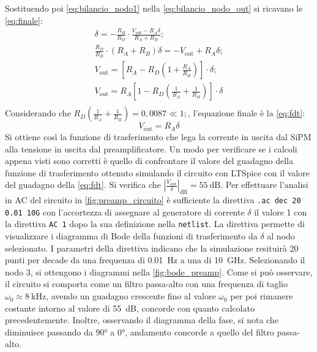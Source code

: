 Sostituendo poi \autoref*{eq:bilancio_nodo1} nella \autoref*{eq:bilancio_nodo_out} si ricavano le \autoref*{eq:finale}:
\begin{equation}
    \begin{gathered}
        \delta = -\frac{R_B}{R_D} \cdot \frac{V_\text{out} - R_A \delta}{R_A + R_B}; \\
        \frac{R_D}{R_B} \cdot (R_A + R_B) \delta = -V_\text{out}+R_A \delta; \\
        V_\text{out}=[R_A-R_D(1+\frac{R_A}{R_B})] \cdot \delta; \\
        V_\text{out}=R_A [1-R_D(\frac{1}{R_A}+\frac{1}{R_B})] \cdot \delta \\
    \end{gathered}
\label{eq:finale}
\end{equation}
Considerando che $R_D(\frac{1}{R_A}+\frac{1}{R_B})=0,0087 \ll 1;$, l'equazione finale è la \autoref*{eq:fdt}:
\begin{equation}
    V_\text{out}=R_A \delta
\label{eq:fdt}
\end{equation}
Si ottiene così la funzione di trasferimento che lega la corrente in uscita dal SiPM alla tensione in uscita dal preamplificatore. Un modo per 
verificare se i calcoli appena visti sono corretti è quello di confrontare il valore del guadagno della funzione di trasferimento ottenuto 
simulando il circuito con LTSpice con il valore del guadagno della \autoref*{eq:fdt}. Si verifica che 
$\left| \frac{V_{\text{out}}}{\delta} \right|_{\text{dB}}=\SI{55}{\dB}$. Per effettuare l'analisi in AC del circuito in \autoref*{fig:preamp_circuito} 
è sufficiente la direttiva \texttt{.ac dec 20 0.01 10G} 
con l'accortezza di assegnare al generatore di corrente $\delta$ il valore 1 con la direttiva \texttt{AC 1} dopo la sua definizione nella \texttt{netlist}.
La direttiva permette di visualizzare i diagramma di Bode della funzioni di trasferimento da $\delta$ al nodo selezionato. I parametri della direttiva
indicano che la simulazione resituirà 20 punti per decade da una frequenza di \SI{0.01}{\hertz} a una di \SI{10}{\giga\hertz}. Selezionando il nodo $3$, 
si ottengono i diagrammi nella \autoref*{fig:bode_preamp}.
Come si può osservare, il circuito si comporta come un filtro passa-alto con una frequenza di taglio $\omega_0 \approx \SI{8}{\kilo\hertz}$, avendo 
un guadagno crescente fino al valore $\omega_0$ per poi rimanere costante intorno al valore di \SI{55}{\dB}, concorde con quanto calcolato precedentemente.
Inoltre, osservando il diagramma della fase, si nota che diminuisce passando da \ang{90} a \ang{0}, andamento concorde a quello del filtro passa-alto.
